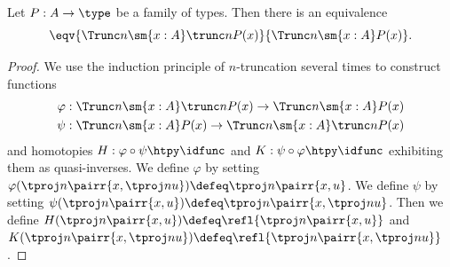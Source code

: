%
\begin{thm}\label{thm:trunc-in-truncated-sigma}
Let $P:A\to\type$ be a family of types. Then there is an equivalence
\begin{equation*}
\eqv{\Trunc n{\sm{x:A}\trunc n{P(x)}}}{\Trunc n{\sm{x:A}P(x)}}.
\end{equation*}
\end{thm}

\begin{proof}
We use the induction principle of $n$-truncation several times to construct
functions
\begin{align*}
\varphi & : \Trunc n{\sm{x:A}\trunc n{P(x)}}\to\Trunc n{\sm{x:A}P(x)}\\
\psi & : \Trunc n{\sm{x:A}P(x)}\to \Trunc n{\sm{x:A} \trunc n{P(x)}}
\end{align*}
and homotopies $H:\varphi\circ\psi\htpy \idfunc$ and $K:\psi\circ\varphi\htpy
\idfunc$ exhibiting them as quasi-inverses.
We define $\varphi$ by setting $\varphi(\tproj n{\pairr{x,\tproj nu}})\defeq\tproj n{\pairr{x,u}}$.
We define $\psi$ by setting $\psi(\tproj n{\pairr{x,u}})\defeq\tproj n{\pairr{x,\tproj nu}}$.
Then we define $H(\tproj n{\pairr{x,u}})\defeq \refl{\tproj n{\pairr{x,u}}}$ and
$K(\tproj n{\pairr{x,\tproj nu}})\defeq \refl{\tproj n{\pairr{x,\tproj nu}}}$.
\end{proof}
